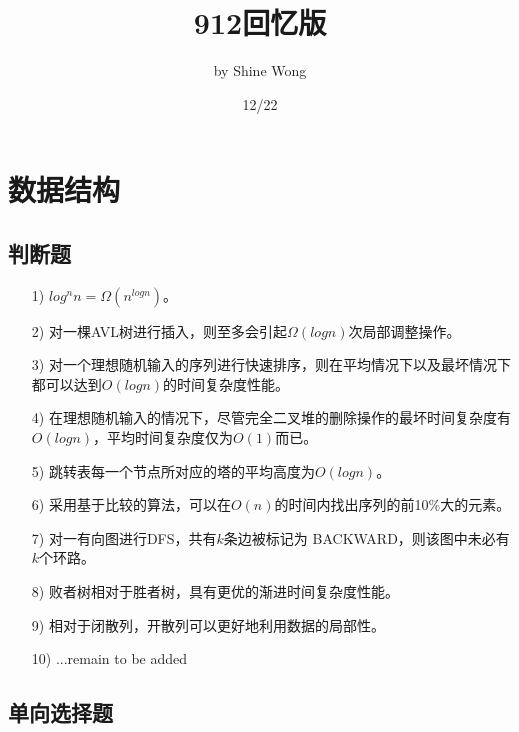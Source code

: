 \documentclass[UTF8,12pt]{ctexart}
\title{\kaishu 912回忆版}
\author{by Shine Wong}
\date{12/22}
\begin{document}
\maketitle

	\section{数据结构}

	\subsection{判断题}

		\begin{itemize}

			\item[1)]$log^nn = \Omega(n^{logn})$。
			\item[2)]对一棵AVL树进行插入，则至多会引起$\Omega(logn)$次局部调整操作。
			\item[3)]对一个理想随机输入的序列进行快速排序，则在平均情况下以及最坏情况下都可以达到$O(logn)$的时间复杂度性能。
			\item[4)]在理想随机输入的情况下，尽管完全二叉堆的删除操作的最坏时间复杂度有$O(logn)$，平均时间复杂度仅为$O(1)$而已。
			\item[5)]跳转表每一个节点所对应的塔的平均高度为$O(logn)$。\\
			\item[6)]采用基于比较的算法，可以在$O(n)$的时间内找出序列的前10\%大的元素。
			\item[7)]对一有向图进行DFS，共有$k$条边被标记为 BACKWARD，则该图中未必有$k$个环路。\\
			\item[8)]败者树相对于胜者树，具有更优的渐进时间复杂度性能。\\
			\item[9)]相对于闭散列，开散列可以更好地利用数据的局部性。\\
			\item[10)]...remain to be added


		\end{itemize}

	\subsection{单向选择题}
\end{document}
